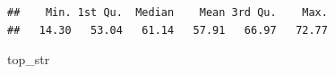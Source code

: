 \documentclass[
]{article}
\newenvironment{Shaded}{\begin{snugshade}}{\end{snugshade}}
\newcommand{\FunctionTok}[1]{\textcolor[rgb]{0.13,0.29,0.53}{\textbf{#1}}}
\newcommand{\NormalTok}[1]{#1}
\newcommand{\SpecialCharTok}[1]{\textcolor[rgb]{0.81,0.36,0.00}{\textbf{#1}}}
\begin{document}
\begin{Shaded}
\end{Shaded}

\begin{verbatim}
##    Min. 1st Qu.  Median    Mean 3rd Qu.    Max. 
##   14.30   53.04   61.14   57.91   66.97   72.77
\end{verbatim}

\begin{Shaded}
\begin{Highlighting}[]
\NormalTok{top\_str}
\end{Highlighting}
\end{Shaded}
\end{document}
